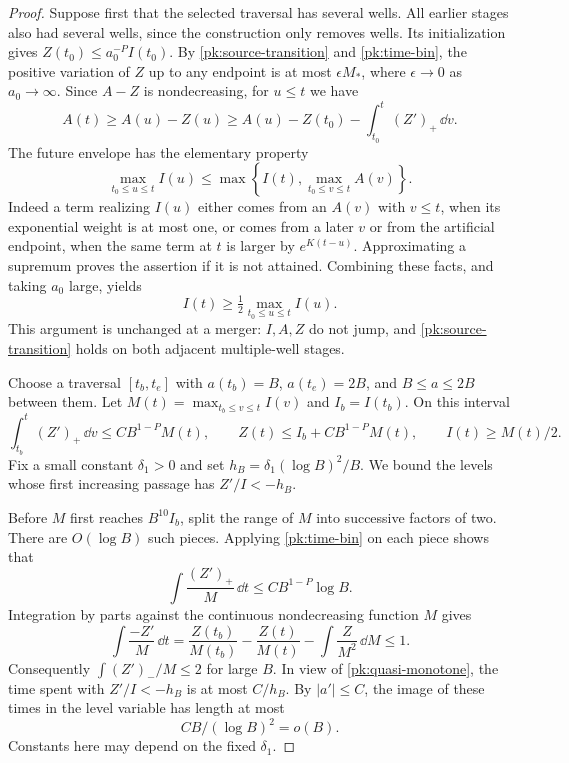 \begin{proof}
Suppose first that the selected traversal has several wells.  All
earlier stages also had several wells, since the construction only
removes wells.  Its initialization gives
$Z(t_0)\le a_0^{-P}I(t_0)$.  By
\eqref{pk:source-transition} and \eqref{pk:time-bin}, the positive
variation of $Z$ up to any endpoint is at most $\epsilon M_*$,
where $\epsilon\to0$ as $a_0\to\infty$.  Since $A-Z$ is
nondecreasing, for $u\le t$ we have
\[
 A(t)\ge A(u)-Z(u)
 \ge A(u)-Z(t_0)-\int_{t_0}^t(Z')_+\,\dd v.
\]
The future envelope has the elementary property
\begin{equation}\label{pk:envelope-history}
 \max_{t_0\le u\le t}I(u)
 \le\max\left\{I(t),\max_{t_0\le v\le t}A(v)\right\}.
\end{equation}
Indeed a term realizing $I(u)$ either comes from an $A(v)$ with
$v\le t$, when its exponential weight is at most one, or comes
from a later $v$ or from the artificial endpoint, when the same
term at $t$ is larger by $e^{K(t-u)}$.  Approximating a supremum
proves the assertion if it is not attained.  Combining these facts,
and taking $a_0$ large, yields
\begin{equation}\label{pk:quasi-monotone}
 I(t)\ge \tfrac12\max_{t_0\le u\le t}I(u).
\end{equation}
This argument is unchanged at a merger: $I,A,Z$ do not jump, and
\eqref{pk:source-transition} holds on both adjacent multiple-well
stages.

Choose a traversal $[t_b,t_e]$ with $a(t_b)=B$,
$a(t_e)=2B$, and $B\le a\le2B$ between them.  Let
$M(t)=\max_{t_b\le v\le t}I(v)$ and $I_b=I(t_b)$.
On this interval
\begin{equation}\label{pk:band-positive}
 \int_{t_b}^t(Z')_+\,\dd v\le CB^{1-P}M(t),\qquad
 Z(t)\le I_b+CB^{1-P}M(t),\qquad I(t)\ge M(t)/2.
\end{equation}
Fix a small constant $\delta_1>0$ and set
$h_B=\delta_1(\log B)^2/B$.
We bound the levels whose first increasing passage has
$Z'/I<-h_B$.

Before $M$ first reaches $B^{10}I_b$, split the range of $M$ into
successive factors of two.  There are $O(\log B)$ such pieces.
Applying \eqref{pk:time-bin} on each piece shows that
\[
 \int\frac{(Z')_+}{M}\,\dd t\le CB^{1-P}\log B.
\]
Integration by parts against the continuous nondecreasing function
$M$ gives
\[
 \int\frac{-Z'}M\,\dd t
 =\frac{Z(t_b)}{M(t_b)}-\frac{Z(t)}{M(t)}
   -\int \frac{Z}{M^2}\,\dd M\le1.
\]
Consequently $\int (Z')_-/M\le2$ for large $B$.  In view of
\eqref{pk:quasi-monotone}, the time spent with $Z'/I<-h_B$ is at
most $C/h_B$.  By $|a'|\le C$, the image of these times in the
level variable has length at most
\begin{equation}\label{pk:bad-levels}
 C B/(\log B)^2=o(B).
\end{equation}
Constants here may depend on the fixed $\delta_1$.


\end{proof}
